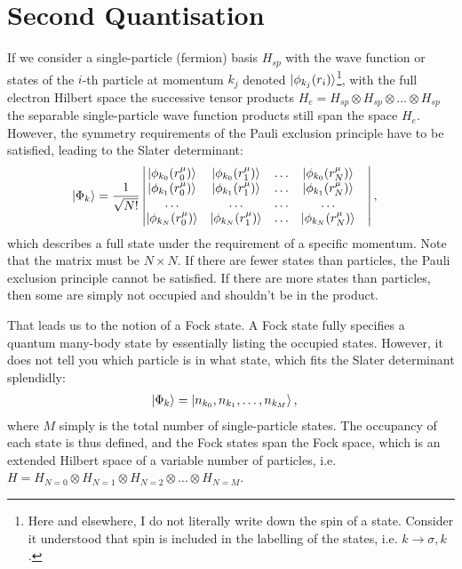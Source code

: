 \section{Second Quantisation}
\label{sec:secondquantisation}
If we consider a single-particle (fermion) basis $H_{sp}$ with the wave function or states of the $i$-th particle at momentum $k_j$ denoted $\ket{\phi_{k_j}(r_i)}$\footnote{Here and elsewhere, I do not literally write down the spin of a state. Consider it understood that spin is included in the labelling of the states, i.e. $k \rightarrow \sigma, k$.}, with the full electron Hilbert space the successive tensor products $H_{e} = H_{sp} \otimes H_{sp} \otimes \ldots \otimes H_{sp}$ the separable single-particle wave function products still span the space $H_e$. However, the symmetry requirements of the Pauli exclusion principle have to be satisfied, leading to the Slater determinant\cite{yuli}:
\begin{align}
\ket{\Phi_k} &= \frac{1}{\sqrt{N!}} \begin{vmatrix}
\ket{\phi_{k_0}(r_0^\mu)} & \ket{\phi_{k_0}(r_1^\mu)} &\ldots& \ket{\phi_{k_0}(r_N^\mu)} \\
\ket{\phi_{k_1}(r_0^\mu)} & \ket{\phi_{k_1}(r_1^\mu)} &\ldots& \ket{\phi_{k_1}(r_N^\mu)} \\
\ldots&\ldots&\ldots&\ldots&\\
\ket{\phi_{k_N}(r_0^\mu)} & \ket{\phi_{k_N}(r_1^\mu)} &\ldots& \ket{\phi_{k_N}(r_N^\mu)} \\
\end{vmatrix},
\label{eq:slaterdeterminant}
\end{align}
which describes a full state under the requirement of a specific momentum. Note that the matrix must be $N\times N$. If there are fewer states than particles, the Pauli exclusion principle cannot be satisfied. If there are more states than particles, then some are simply not occupied and shouldn't be in the product.

That leads us to the notion of a Fock state. A Fock state fully specifies a quantum many-body state by essentially listing the occupied states. However, it does not tell you which particle is in what state, which fits the Slater determinant splendidly:
\begin{align}
\ket{\Phi_k} &= \ket{n_{k_0}, n_{k_1},\ldots, n_{k_M}},
\label{eq:fock}
\end{align}
where $M$ simply is the total number of single-particle states. The occupancy of each state is thus defined, and the Fock states span the Fock space, which is an extended Hilbert space of a variable number of particles, i.e. $H = H_{N=0} \otimes H_{N=1} \otimes H_{N=2}\otimes \ldots \otimes H_{N=M}$. 

